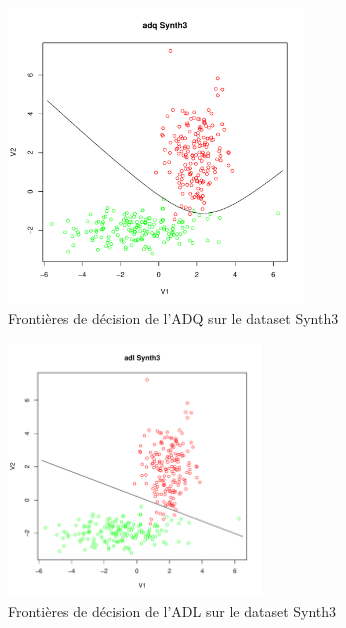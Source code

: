 \documentclass{report}
\begin{document}
\begin{figure}[ht!]
\begin{center}
    \includegraphics[width=0.7\textwidth]{results/adq/adq-Synth3.pdf}
    \caption{Frontières de décision de l'ADQ sur le dataset Synth3}
\end{center}
\end{figure}

\newpage
\begin{figure}[ht!]
\begin{center}
    \includegraphics[width=0.6\textwidth]{results/adl/adl-Synth3.pdf}
    \caption{Frontières de décision de l'ADL sur le dataset Synth3}
\end{center}
\end{figure}
\end{document}
